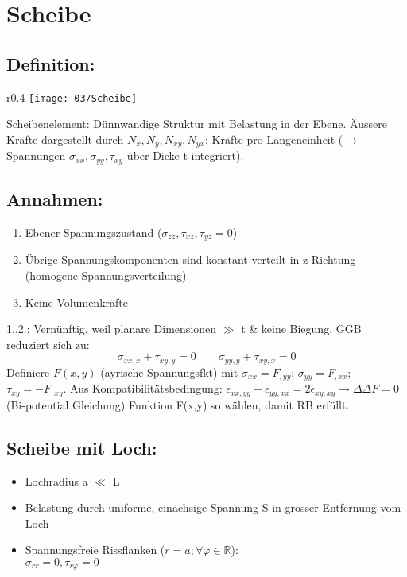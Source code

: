 \section{Scheibe}
    \subsection{Definition:}
        \begin{wrapfigure}[5]{r}{0.4\linewidth}
            \vspace{-5mm}
            \texttt{[image: 03/Scheibe]}
        \end{wrapfigure}
        Scheibenelement: Dünnwandige Struktur mit Belastung in der Ebene. Äussere Kräfte dargestellt durch $N_x,N_y,N_{xy},N_{yx}$: Kräfte pro Längeneinheit ($\rightarrow$ Spannungen $\sigma_{xx},\sigma_{yy},\tau_{xy}$ über Dicke t integriert).\\
        
    \subsection{Annahmen:}
        \begin{enumerate}[noitemsep]
            \item Ebener Spannungszustand ($\sigma_{zz},\tau_{xz},\tau_{yz}=0$)
            \item Übrige Spannungskomponenten sind konstant verteilt in z-Richtung (homogene Spannungsverteilung)
            \item Keine Volumenkräfte
        \end{enumerate}
        1.,2.: Vernünftig, weil planare Dimensionen $\gg$ t \& keine Biegung. GGB reduziert sich zu:
        \[\sigma_{xx,x} + \tau_{xy,y}=0\quad\quad\sigma_{yy,y} + \tau_{xy,x}=0\]
        Definiere $F(x,y)$ (ayrische Spannungsfkt) mit $\sigma_{xx}=F_{,yy}$; $\sigma_{yy}=F_{,xx}$; $\tau_{xy}=-F_{,xy}$. Aus Kompatibilitätsbedingung: $\epsilon_{xx,yy}+\epsilon_{yy,xx}=2\epsilon_{xy,xy} \rightarrow \Delta\Delta F=0$ (Bi-potential Gleichung) Funktion F(x,y) so wählen, damit RB erfüllt.
        
    \subsection{Scheibe mit Loch:}

        \begin{itemize}
            \item Lochradius a $\ll$ L
            \item Belastung durch uniforme, einachsige Spannung S in grosser Entfernung vom Loch
            \item Spannungsfreie Rissflanken ($r = a; \forall\varphi\in\mathbb{R} $):\\ $\sigma_{rr}=0, \tau_{r\varphi}=0$
        \end{itemize}
        
